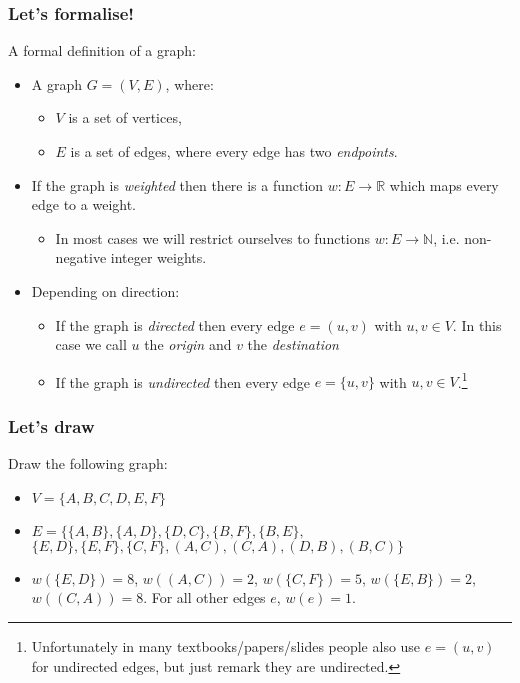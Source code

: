\begin{frame}
	\frametitle{Let's formalise!}

A formal definition of a graph:
			\begin{itemize}
				\item A graph $G=(V,E)$, where:
					\begin{itemize}
						\item $V$ is a set of vertices,
						\item $E$ is a set of edges, where every edge has two \textit{endpoints}.
					\end{itemize}
					
				\item If the graph is \textit{weighted} then there is a function $w: E \to \mathbb{R}$ which maps every edge to
					a weight.
					
					\begin{itemize}
						\item In most cases we will restrict ourselves to functions $w: E \to \mathbb{N}$, i.e. non-negative integer weights.
					\end{itemize}
					
				\item Depending on direction:
					\begin{itemize}
					
						\item If the graph is \textit{directed} then every edge $e = (u,v)$ with $u,v \in V$. In this case we call
							$u$ the \textit{origin} and $v$ the \textit{destination}
					
				\item If the graph is \textit{undirected} then every edge $e = \{u,v\}$ with $u,v \in V$.\footnote{Unfortunately
						in many textbooks/papers/slides people also use $e=(u,v)$ for undirected edges, but just remark they are
					undirected.}
					\end{itemize}
			\end{itemize}
\end{frame}

\begin{frame}
	\frametitle{Let's draw}

		Draw the following graph:
		\begin{itemize}
			\item $V = \{A,B,C,D,E,F\}$\\
			\item	$E = \{
			\{A, B\},
			\{A, D\},
			\{D, C\},
			\{B, F\},
			\{B, E\},$\\$
			\{E, D\},
			\{E, F\},
			\{C, F\},
			(A,C),
			(C,A),
			(D,B),
			(B,C)
		\}$\\
	\item $w(\{E,D\}) = 8$, $w((A,C)) = 2$, $w(\{C,F\}) = 5$, $w(\{E,B\}) = 2$, $w((C,A)) = 8$.
		For all other edges $e$, $w(e) = 1$.
		\end{itemize}
\end{frame}

